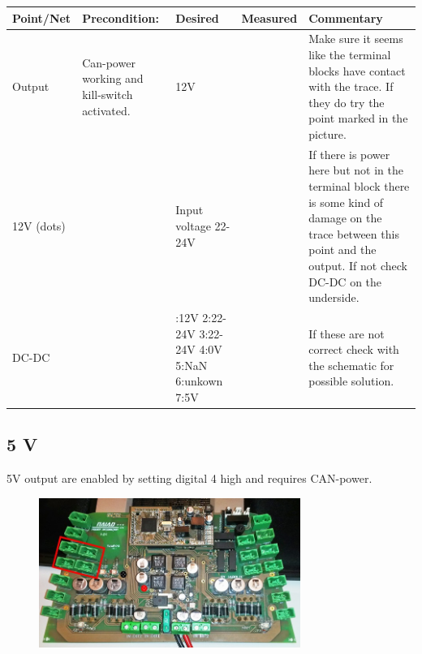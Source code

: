 \begin{table}[ht]
\begin{tabularx}{\textwidth}{|>{\hsize=0.6\hsize}X|>{\hsize=0.8\hsize}X|>{\hsize=0.8\hsize}X|c|>{\hsize=1.8\hsize}X|}
\hline
Point/Net & Precondition: & Desired & Measured & Commentary \\ 
\hline
Output & Can-power working and kill-switch activated. & 12V &   & Make sure it seems like the terminal blocks have contact with the trace. If they do try the point marked in the picture. \\ 
\hline 
12V (dots) &  & Input voltage 22-24V &    & If there is power here but not in the terminal block there is some kind of damage on the trace between this point and the output. If not check DC-DC on the underside. \\ 
\hline 
DC-DC &  & 	1:12V 2:22-24V 3:22-24V 4:0V 5:NaN 6:unkown 7:5V &   & If these are not correct check with the schematic for possible solution.  \\ 
\hline 
\end{tabularx}
\end{table}

\newpage

\newpage
\subsection{5 V}
5V output are enabled by setting digital 4 high and requires CAN-power. 
\begin{figure}[!ht]
	\begin{center}
		\includegraphics[width=0.76\textwidth]{./Images/Unit_test_power_board/5v.jpg}
		\label{motor_pwr}
	\end{center}
\end{figure}

